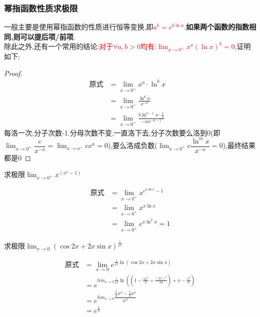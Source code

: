 \documentclass[8pt a4paper, oneside, UTF8]{ctexbook}
\begin{document}
\begin{sloppypar}
    \subsubsection{幂指函数性质求极限}
    一般主要是使用幂指函数的性质进行恒等变换,即\textcolor{red}{$a^b=e^{b\ln a}$}.\textbf{如果两个函数的指数相同,则可以提后项/前项}.\\
    除此之外,还有一个常用的结论:\textcolor{red}{对于$\forall a,b>0$均有:$\lim_{x\to 0^+}x^a(\ln x)^b=0$},证明如下:
    \begin{proof}
        \begin{align*}
            \text{原式} & = \lim_{x\to0^{+}}x^{a}\cdot\ln^{b}x & \\
             & = \lim_{x\to0^{+}}\frac{\ln^{b}x}{x^{-a}} &\\
             & =\lim_{x\to0^{+}}\frac{b\ln^{b-1}x\cdot\frac{1}{x}}{-ax^{-a-1}}
        \end{align*}
    每洛一次,分子次数-1.分母次数不变,一直洛下去,分子次数要么洛到0(即$\lim_{x\to 0^+}\dfrac{c}{x^{-a}}=\lim_{x\to o^+} cx^a=0$),要么洛成负数($\lim_{x\to 0^+ }c\dfrac{\ln^m x}{x^{-a}}=0$),最终结果都是0
    \end{proof}
    \begin{problem}
    求极限$\lim_{x\to0^+}x^{(x^x-1)}$
    \end{problem}
    \begin{solution}
        \begin{align*}
          \text{原式} & =\lim_{x\to0^+}x^{e^{x \ln x}-1}\\
          & =\lim_{x\to0^+} x^{x \ln x} \\
          & =\lim_{x\to0^+} e^{x \ln^2 x}=1
        \end{align*}
    \end{solution}
    \begin{problem}
        求极限$\operatorname*{lim}_{x\to0}(\cos2x+2x \sin x)^{\frac{1}{x^{4}}}$
    \end{problem}
    \begin{solution}
            \begin{align*}
              \text{原式} & =\lim_{x\to0}e^{\frac{1}{x^4}\ln(\cos 2x+2x\sin x)}\\
              & = e^{lim_{x\to0}{\frac{1}{x^4} \ln((1-\frac{4x^2}{2}+\frac{(2x)^4}{24})+x-\frac{x^3}{6})}}\\
              & = e^{lim_{x\to0}{\dfrac{\frac{2}{3}x^4-\frac{1}{3}x^4}{x^4}}}\\
              & = e^{\frac{1}{3}}
            \end{align*}

\end{solution}
\end{sloppypar}
\end{document}
